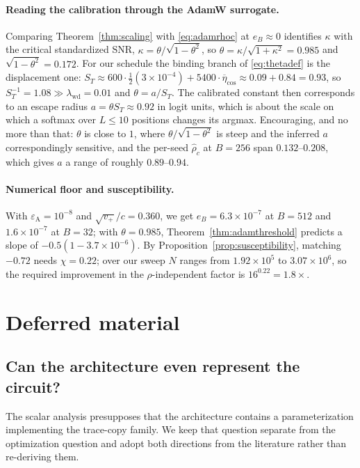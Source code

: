 \documentclass{article}
\theoremstyle{plain}
\theoremstyle{definition}
\theoremstyle{remark}
\newcommand{\1}{\mathbf{1}}
\newcommand{\wdc}{\mathrm{wd}}
\begin{document}
\paragraph{Reading the calibration through the AdamW surrogate.}
Comparing Theorem~\ref{thm:scaling} with \eqref{eq:adamrhoc} at $e_B\approx0$
identifies $\kappa$ with the critical standardized SNR,
$\kappa = \theta/\sqrt{1-\theta^2}$, so $\theta = \kappa/\sqrt{1+\kappa^2} =
0.985$ and $\sqrt{1-\theta^2} = 0.172$. For our schedule the binding branch of
\eqref{eq:thetadef} is the displacement one:
$S_T\approx600\cdot\tfrac12(3{\times}10^{-4}) + 5400\cdot\overline\eta_{\cos}
\approx0.09+0.84 = 0.93$, so $S_T^{-1} = 1.08\gg\lambda_\wdc = 0.01$ and
$\theta = a/S_T$. The calibrated constant then corresponds to an escape radius
$a = \theta S_T\approx0.92$ in logit units, which is about the scale on which a
softmax over $L\le10$ positions changes its argmax. Encouraging, and no more than
that: $\theta$ is close to $1$, where $\theta/\sqrt{1-\theta^2}$ is steep and the
inferred $a$ correspondingly sensitive, and the per-seed $\hat\rho_c$ at $B=256$
span $0.132$--$0.208$, which gives $a$ a range of roughly $0.89$--$0.94$.

\paragraph{Numerical floor and susceptibility.}
With $\varepsilon_{\mathrm A} = 10^{-8}$ and $\sqrt{v_+}/c = 0.360$, we get
$e_B = 6.3\times10^{-7}$ at $B=512$ and $1.6\times10^{-7}$ at $B=32$; with
$\theta = 0.985$, Theorem~\ref{thm:adamthreshold} predicts a slope of
$-0.5(1-3.7\times10^{-6})$. By Proposition~\ref{prop:susceptibility}, matching
$-0.72$ needs $\chi = 0.22$; over our sweep $N$ ranges from $1.92\times10^5$ to
$3.07\times10^6$, so the required improvement in the $\rho$-independent factor is
$16^{0.22} = 1.8\times$.

\section{Deferred material}
\label{app:deferred}

\subsection{Can the architecture even represent the circuit?}
\label{app:repr}

The scalar analysis presupposes that the architecture contains a
parameterization implementing the trace-copy family. We keep that question
separate from the optimization question and adopt both directions from the
literature rather than re-deriving them.
\end{document}
